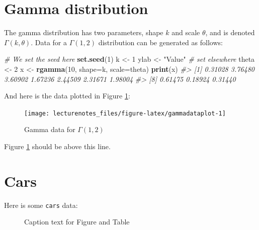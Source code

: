 \documentclass[
]{book}
\newenvironment{Shaded}{\begin{snugshade}}{\end{snugshade}}
\newcommand{\CommentTok}[1]{\textcolor[rgb]{0.56,0.35,0.01}{\textit{#1}}}
\newcommand{\DataTypeTok}[1]{\textcolor[rgb]{0.13,0.29,0.53}{#1}}
\newcommand{\DecValTok}[1]{\textcolor[rgb]{0.00,0.00,0.81}{#1}}
\newcommand{\KeywordTok}[1]{\textcolor[rgb]{0.13,0.29,0.53}{\textbf{#1}}}
\newcommand{\NormalTok}[1]{#1}
\newcommand{\StringTok}[1]{\textcolor[rgb]{0.31,0.60,0.02}{#1}}
\renewcommand{\CommentTok}[1]{\textcolor[rgb]{0.3,0.3,0.3}{\textit{#1}}}
\renewcommand{\DecValTok}[1]{\textcolor[RGB]{229,120,109}{#1}}
\renewcommand{\DecValTok}[1]{\textcolor[RGB]{203,75,22}{#1}}
\begin{document}
\hypertarget{gamma-distribution}{%
\section{Gamma distribution}\label{gamma-distribution}}

The gamma distribution has two parameters, shape \(k\) and scale \(\theta\), and is denoted \(\Gamma(k, \theta)\).
Data for a \(\Gamma(1, 2)\) distribution can be generated as follows:

\begin{Shaded}
\begin{Highlighting}[]
\CommentTok{# We set the seed here}
\KeywordTok{set.seed}\NormalTok{(}\DecValTok{1}\NormalTok{)}
\NormalTok{k <-}\StringTok{ }\DecValTok{1}
\NormalTok{ylab <-}\StringTok{  "Value"} \CommentTok{# set elsewhere}
\NormalTok{theta <-}\StringTok{ }\DecValTok{2}
\NormalTok{x <-}\StringTok{ }\KeywordTok{rgamma}\NormalTok{(}\DecValTok{10}\NormalTok{, }\DataTypeTok{shape=}\NormalTok{k, }\DataTypeTok{scale=}\NormalTok{theta)}
\KeywordTok{print}\NormalTok{(x)}
\CommentTok{#>  [1] 0.31028 3.76480 3.60902 1.67236 2.44509 2.31671 1.98004}
\CommentTok{#>  [8] 0.61475 0.18924 0.31440}
\end{Highlighting}
\end{Shaded}

And here is the data plotted in Figure \ref{fig:gammadataplot}:

\begin{figure}[H]

{\centering \texttt{[image: lecturenotes\_files/figure-latex/gammadataplot-1]} 

}

\caption{Gamma data for $\Gamma(1, 2)$}\label{fig:gammadataplot}
\end{figure}

Figure \ref{fig:gammadataplot} should be above this line.

\clearpage

\hypertarget{cars}{%
\section{Cars}\label{cars}}

Here is some \texttt{cars} data:

\begin{figure}[H]

{\centering {}

}

\caption{Caption text for Figure and Table}\label{fig:carsfigureandtable}
\end{figure}
\end{document}
